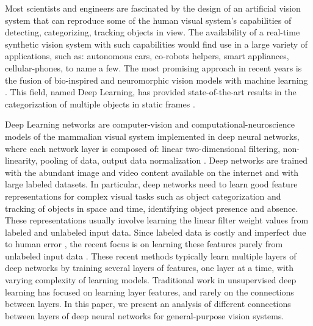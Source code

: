 \documentclass{article} %
\begin{document}
Most scientists and engineers are fascinated by the design of an artificial vision system that can 
reproduce some of the human visual system's capabilities of detecting, categorizing, tracking objects in view. 
The availability of a real-time synthetic vision system with such capabilities would find use in a large 
variety of applications, such as: autonomous cars, co-robots helpers, smart appliances, cellular-phones, to name a few. 
The most promising approach in recent years is the fusion of bio-inspired and neuromorphic vision models with machine learning 
\cite{lecun_gradient-based_1998,hadsell_dimensionality_2006,gregor_structured_2011,riesenhuber_hierarchical_1999,serre_feedforward_2007,serre_neuromorphic_2010,jarrett_what_2009,lecun_convolutional_2010,boureau_theoretical_2010}.
This field, named Deep Learning, has provided state-of-the-art results in the categorization 
of multiple objects in static frames \cite{krizhevsky_imagenet_2012}.

Deep Learning networks are computer-vision and computational-neuroscience models of the mammalian visual 
system implemented in deep neural networks, where each network layer is composed of: linear two-dimensional filtering, 
non-linearity, pooling of data, output data normalization \cite{jarrett_what_2009,lecun_convolutional_2010,boureau_theoretical_2010}. 
Deep networks are trained with the abundant image and video content available on the internet and with large labeled datasets. 
In particular, deep networks need to learn good feature representations for complex visual tasks such as object categorization and 
tracking of objects in space and time, identifying object presence and absence. These representations usually involve learning the linear 
filter weight values from labeled and unlabeled input data. Since labeled data is costly and imperfect due to human error 
\cite{karpathy_lessons_2011, torralba_unbiased_2011, hou_meta-theory_2012}, the recent focus is on learning these features purely 
from unlabeled input data \cite{olshausen_emergence_1996, hyvarinen_independent_2000, hinton_fast_2006, vincent_extracting_2008, coates_analysis_2011}.
These recent methods typically learn multiple layers of deep networks by training several layers of features, one layer at a time, with varying complexity of 
learning models. Traditional work in unsupervised deep learning has focused on learning layer features, and rarely on the connections 
between layers. In this paper, we present an analysis of different connections between layers of deep neural networks for general-purpose vision systems. 
\end{document}
